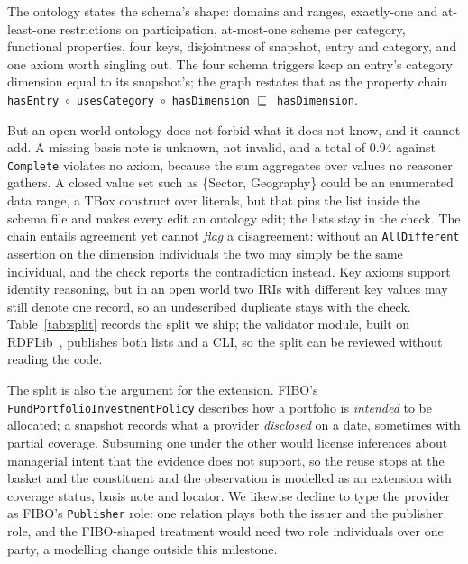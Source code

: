 The ontology states the schema's shape: domains and ranges, exactly-one and
at-least-one restrictions on participation, at-most-one scheme per category,
functional properties, four keys, disjointness of snapshot, entry and category,
and one axiom worth singling out. The four schema triggers keep an entry's
category dimension equal to its snapshot's; the graph restates that as the
property chain
\texttt{hasEntry}~$\circ$~\texttt{usesCategory}~$\circ$~\texttt{hasDimension}
$\sqsubseteq$~\texttt{hasDimension}.

But an open-world ontology\cite{owl2profiles} does not forbid what it does not
know, and it cannot add. A missing basis note is unknown, not invalid, and a
total of 0.94 against \texttt{Complete} violates no axiom, because the sum
aggregates over values no reasoner gathers. A closed value set such as
\{Sector, Geography\} could be an enumerated data range, a TBox construct over
literals, but that pins the list inside the schema file and makes every edit an
ontology edit; the lists stay in the check. The chain entails agreement yet cannot \emph{flag} a
disagreement: without an \texttt{AllDifferent} assertion on the dimension
individuals the two may simply be the same individual, and the check reports the
contradiction instead. Key axioms support identity reasoning, but in an open world two IRIs
with different key values may still denote one record, so an undescribed
duplicate stays with the check. Table~\ref{tab:split} records the split we ship; the validator module,
built on RDFLib~\cite{rdflib}, publishes both lists and a CLI, so the split can
be reviewed without reading the code.



The split is also the argument for the extension. FIBO's
\texttt{Fund\-Portfolio\-Investment\-Policy} describes how a portfolio is
\emph{intended} to be allocated; a snapshot records what a provider
\emph{disclosed} on a date, sometimes with partial coverage. Subsuming one under
the other would license inferences about managerial intent that the evidence
does not support, so the reuse stops at the basket and the constituent and the
observation is modelled as an extension with coverage status, basis note and
locator. We likewise decline to type the provider as FIBO's \texttt{Publisher}
role: one relation plays both the issuer and the publisher role, and the
FIBO-shaped treatment would need two role individuals over one party, a modelling
change outside this milestone.

